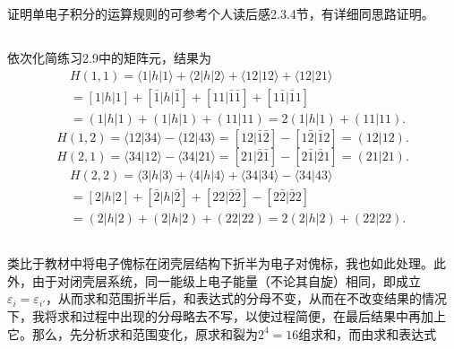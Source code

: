 \documentclass[UTF8]{ctexart}
\newcommand\la{\langle}
\newcommand\ra{\rangle}
\begin{document}
		证明单电子积分的运算规则的可参考个人读后感2.3.4节，有详细同思路证明。
	
	\subsection{}
		依次化简练习2.9中的矩阵元，结果为
		\[
		\begin{aligned}
			&H(1,1) = \la 1|h|1 \ra + \la 2|h|2 \ra + \la 12|12 \ra + \la 12 | 21\ra \\
			&= [1|h|1] + [\bar 1|h|\bar 1] + [11|\bar1 \bar1] + [1\bar1 | \bar11] \\
			&= (1|h|1) + (1|h|1) + (11|11) = 2(1|h|1) + (11|11).
		\end{aligned}
		\]
		\[
			H(1,2) = \la12|34\ra - \la12|43\ra = [12|\bar1\bar2] - [1\bar2|\bar12] = (12|12).
		\]
		\[
			H(2,1) = \la34|12\ra - \la34|21\ra = [21|\bar2\bar1] - [2\bar1|\bar21] = (21|21).
		\]
		\[
		\begin{aligned}
			&H(2,2) = \la3|h|3\ra + \la4|h|4\ra + \la34|34\ra - \la34|43\ra \\
			&= [2|h|2] + [\bar2|h|\bar2] + [22|\bar2\bar2] - [2\bar2|\bar22] \\
			&= (2|h|2) + (2|h|2) + (22|22) = 2(2|h|2) + (22|22).
		\end{aligned}
		\]
	
	\subsection{}
		类比于教材中将电子傀标在闭壳层结构下折半为电子对傀标，我也如此处理。此外，由于对闭壳层系统，同一能级上电子能量（不论其自旋）相同，即成立$\varepsilon_i = \varepsilon_{i'}$，从而求和范围折半后，和表达式的分母不变，从而在不改变结果的情况下，我将求和过程中出现的分母略去不写，以使过程简便，在最后结果中再加上它。那么，先分析求和范围变化，原求和裂为$2^4 = 16$组求和，而由求和表达式
	
	\subsection{}
	
	\subsection{}
	
	\subsection{}
	
\end{document}
